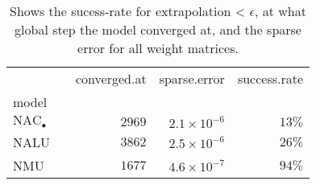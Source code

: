 \begin{table}[H]
\centering
\caption{Shows the sucess-rate for extrapolation < $\epsilon$, at what global step the model converged at, and the sparse error for all weight matrices.} 
\begin{tabular}{ll |rrr}
  \hline
                            & & \multicolumn{1}{l}{          converged.at} & \multicolumn{1}{l}{          sparse.error} & \multicolumn{1}{l}{          success.rate} \\ 
  model                      &     & \multicolumn{1}{l}{                      } & \multicolumn{1}{l}{                      } & \multicolumn{1}{l}{                      } \\ 
   \hline
${\mathrm{NAC}_\bullet}$ &     & $2969$                & $2.1 \times 10^{-6}$ & $13\%$               \\ 
  NALU                       &     & $3862$                & $2.5 \times 10^{-6}$ & $26\%$               \\ 
  NMU                        &     & $1677$                & $4.6 \times 10^{-7}$ & $94\%$               \\ 
   \hline
\end{tabular}
\end{table}
